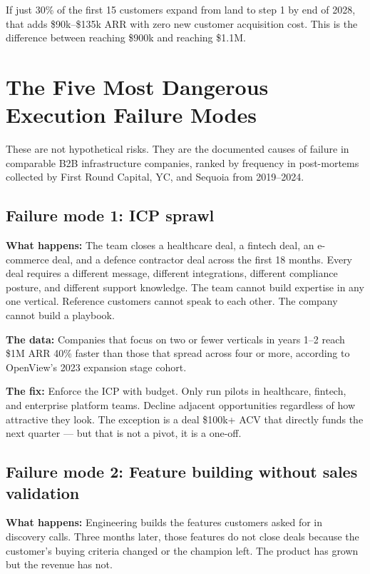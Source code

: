 If just 30\% of the first 15 customers expand from land to step 1 by end of
2028, that adds \$90k--\$135k ARR with zero new customer acquisition cost.
This is the difference between reaching \$900k and reaching \$1.1M.

\section{The Five Most Dangerous Execution Failure Modes}

These are not hypothetical risks. They are the documented causes of failure in
comparable B2B infrastructure companies, ranked by frequency in post-mortems
collected by First Round Capital, YC, and Sequoia from 2019--2024.

\subsection{Failure mode 1: ICP sprawl}

\textbf{What happens:} The team closes a healthcare deal, a fintech deal, an
e-commerce deal, and a defence contractor deal across the first 18 months.
Every deal requires a different message, different integrations, different
compliance posture, and different support knowledge. The team cannot build
expertise in any one vertical. Reference customers cannot speak to each other.
The company cannot build a playbook.

\textbf{The data:} Companies that focus on two or fewer verticals in years 1--2
reach \$1M ARR 40\% faster than those that spread across four or more, according
to OpenView's 2023 expansion stage cohort.

\textbf{The fix:} Enforce the ICP with budget. Only run pilots in healthcare,
fintech, and enterprise platform teams. Decline adjacent opportunities regardless
of how attractive they look. The exception is a deal \$100k+ ACV that directly
funds the next quarter — but that is not a pivot, it is a one-off.

\subsection{Failure mode 2: Feature building without sales validation}

\textbf{What happens:} Engineering builds the features customers asked for in
discovery calls. Three months later, those features do not close deals because
the customer's buying criteria changed or the champion left. The product has
grown but the revenue has not.


